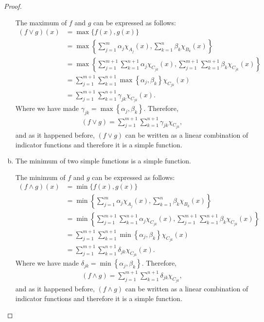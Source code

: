 \begin{questions}
\begin{solution}
\begin{proof}
\begin{enumerate}[a)]
The maximum of $f$ and $g$ can be expressed as follows:
\begin{align*}
(f \vee g)(x) &= \max\{ f(x), g(x) \}\\
&=\max\left\lbrace\sum_{j=1}^m\alpha_j\chi_{A_j}(x),\sum_{k=1}^n\beta_k\chi_{B_k}(x)\right\rbrace\\
&=\max\left\lbrace\sum_{j=1}^{m+1}\sum_{k=1}^{n+1}\alpha_j\chi_{C_{jk}}(x),\sum_{j=1}^{m+1}\sum_{k=1}^{n+1}\beta_k\chi_{C_{jk}}(x)\right\rbrace\\
&=\sum_{j=1}^{m+1}\sum_{k=1}^{n+1}\max\left\lbrace\alpha_j,\beta_k\right\rbrace\chi_{C_{jk}}(x)\\
&=\sum_{j=1}^{m+1}\sum_{k=1}^{n+1}\gamma_{jk}\chi_{C_{jk}}(x).
\end{align*}
Where we have made $\gamma_{jk}=\max\left\lbrace\alpha_j,\beta_k\right\rbrace$. Therefore,
\begin{align*}
(f \vee g)=\sum_{j=1}^{m+1}\sum_{k=1}^{n+1}\gamma_{jk}\chi_{C_{jk}},
\end{align*}
and as it happened before, $(f \vee g)$ can be written as a linear combination of indicator functions and therefore it is a simple function.

\item The minimum of two simple functions is a simple function.

The minimum of $f$ and $g$ can be expressed as follows:
\begin{align*}
(f \wedge g)(x) &= \min\{ f(x), g(x) \}\\
&=\min\left\lbrace\sum_{j=1}^m\alpha_j\chi_{A_j}(x),\sum_{k=1}^n\beta_k\chi_{B_k}(x)\right\rbrace\\
&=\min\left\lbrace\sum_{j=1}^{m+1}\sum_{k=1}^{n+1}\alpha_j\chi_{C_{jk}}(x),\sum_{j=1}^{m+1}\sum_{k=1}^{n+1}\beta_k\chi_{C_{jk}}(x)\right\rbrace\\
&=\sum_{j=1}^{m+1}\sum_{k=1}^{n+1}\min\left\lbrace\alpha_j,\beta_k\right\rbrace\chi_{C_{jk}}(x)\\
&=\sum_{j=1}^{m+1}\sum_{k=1}^{n+1}\delta_{jk}\chi_{C_{jk}}(x).
\end{align*}
Where we have made $\delta_{jk}=\min\left\lbrace\alpha_j,\beta_k\right\rbrace$. Therefore,
\begin{align*}
(f \wedge g)=\sum_{j=1}^{m+1}\sum_{k=1}^{n+1}\delta_{jk}\chi_{C_{jk}},
\end{align*}
and as it happened before, $(f \wedge g)$ can be written as a linear combination of indicator functions and therefore it is a simple function.
\end{enumerate}
\end{proof}
\end{solution}
\end{questions}